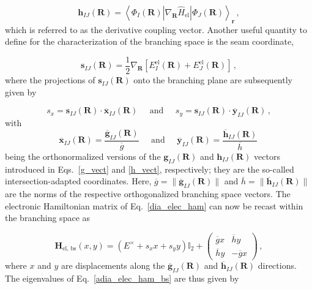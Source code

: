 \documentclass[9pt,bestpractices]{livecoms}
\newcommand{\R}{\mathbf{R}}
\newcommand{\re}{\mathbf{r}}
\newcommand{\g}[2]{\mathbf{g}_{#1#2}(\R)}
\newcommand{\gua}[2]{\overline{\mathbf{g}}_{#1#2}(\R)}
\newcommand{\h}[2]{\mathbf{h}_{#1#2}(\R)}
\newcommand{\hua}[2]{\overline{\mathbf{h}}_{#1#2}(\R)}
\newcommand{\s}[2]{\mathbf{s}_{#1#2}(\R)}
\newcommand{\xua}[2]{\overline{\mathbf{x}}_{#1#2}(\R)}
\newcommand{\yua}[2]{\overline{\mathbf{y}}_{#1#2}(\R)}
\begin{document}
\begin{equation}
\label{h_vect}
    \h{I}{J} = \left< \Phi_I(\R) | \nabla_{\R}\hat{H}_{\text{el}} | \Phi_J(\R) \right>_{\re} \, ,
\end{equation}
which is referred to as the derivative coupling vector.
Another useful quantity to define for the characterization of the branching space is the seam coordinate,\cite{zhang_nonadiabatic_2021} 

\begin{equation}
\label{s_vect}
    \s{I}{J} = \frac{1}{2} \nabla_{\R} \left[E_I^{\text{el}}(\R) + E_J^{\text{el}}(\R)\right] \, ,
\end{equation}
where the projections of $\s{I}{J}$ onto the branching plane are subsequently given by

\begin{equation}
\label{sx_and_sy}
    s_x = \s{I}{J} \cdot \xua{I}{J} \;\;\;\;\; \text{and} \;\;\;\;\; s_y = \s{I}{J} \cdot \yua{I}{J} \, ,
\end{equation}
with
\begin{equation}
\label{int_adapt_coords}
    \xua{I}{J} = \frac{\gua{I}{J}}{\overline{g}} \;\;\;\;\; \text{and} \;\;\;\;\; \yua{I}{J} = \frac{\hua{I}{J}}{\overline{h}} \, 
\end{equation}
being the orthonormalized versions of the $\g{I}{J}$ and $\h{I}{J}$ vectors introduced in Eqs.~\eqref{g_vect} and \eqref{h_vect}, respectively; they are the so-called intersection-adapted coordinates.
Here, $\overline{g} = \|\gua{I}{J}\|$ and $\overline{h} = \|\hua{I}{J}\|$ are the norms of the respective orthogonalized branching space vectors.
The electronic Hamiltonian matrix of Eq.~\eqref{dia_elec_ham} can now be recast within the branching space as 

\begin{equation}
\label{adia_elec_ham_bs}
    \mathbf{H}_{\text{el, bs}}(x, y) = \left(E^\times + s_x x + s_y y\right)\mathbb{I}_2 + 
    \begin{pmatrix}
        \overline{g}x & \overline{h}y \\
        \overline{h}y & -\overline{g}x
    \end{pmatrix} \, ,
\end{equation}
where $x$ and $y$ are displacements along the $\gua{I}{J}$ and $\hua{I}{J}$ directions.\cite{matsika_nonadiabatic_2011}
The eigenvalues of Eq.~\eqref{adia_elec_ham_bs} are thus given by
\end{document}
